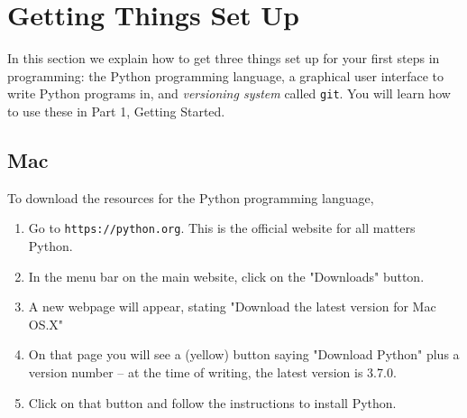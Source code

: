 \section{Getting Things Set Up} 

In this section we explain how to get three things set up for your first steps in programming: the Python programming language, a graphical user interface to write Python programs in, and \emph{versioning system} called \texttt{git}. You will learn how to use these in Part 1, Getting Started.     

\subsection{Mac} 

To download the resources for the Python programming language, 
\begin{enumerate} 
\item Go to \texttt{https://python.org}. This is the official website for all matters Python. 
\item In the menu bar on the main website, click on the "Downloads" button. 
\item A new webpage will appear, stating "Download the latest version for Mac OS.X"
\item On that page you will see a (yellow) button saying "Download Python" plus a version number -- at the time of writing, the latest version is 3.7.0. 
\item Click on that button and follow the instructions to install Python.     
\end{enumerate} 


